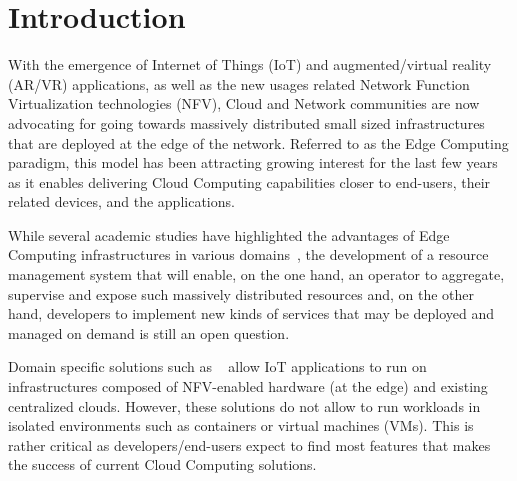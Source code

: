 
\section{Introduction}
\label{sec:intro}


With the emergence of Internet of Things (IoT) and augmented/virtual reality (AR/VR) 
applications, as well as the new usages related Network Function
Virtualization technologies (NFV), Cloud and Network communities are now advocating
for going towards massively distributed small sized infrastructures
that are deployed at the edge of the network.
%
Referred to as the Edge Computing paradigm, this model has been attracting
growing interest for the last few years as it enables delivering Cloud
Computing capabilities closer to end-users, their related devices, and the applications.
%

While several academic studies have highlighted the advantages of Edge
Computing infrastructures in various
domains~\cite{bonomi2012fog,zhang2015cloud,yi2015fog,shi2016edge,satyanarayanan2017emergence},
the development of
a resource management system that will enable, on the one hand,
an operator to aggregate, supervise and expose such massively
distributed resources and, on the other hand, developers to implement
new kinds of services that may be deployed and managed on demand is
still an open question.

Domain specific solutions such as ~\cite{bonomi2012fog} allow IoT applications 
to run on infrastructures composed of NFV-enabled hardware (at the edge) and
existing centralized clouds. However, these solutions do not allow to
run workloads in isolated environments such as containers or virtual
machines (VMs). 
%
This is rather critical as developers/end-users expect to find
most features that makes the success of current Cloud Computing solutions.

